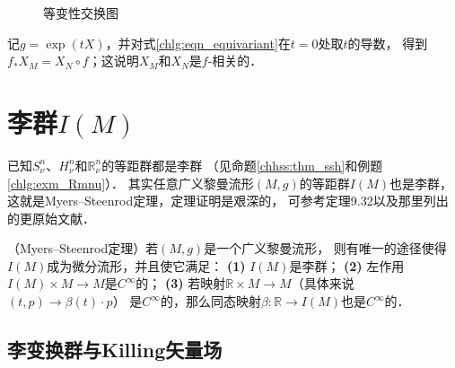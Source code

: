 \begin{figure}[htb]
    \centering
    \caption{等变性交换图}\label{chlg:pic_eqv-exchange}
\end{figure}

记$g=\exp(t X)$，并对式\eqref{chlg:eqn_equivariant}在$t=0$处取$t$的导数，
得到$f_* X_M = X_N \circ f$；这说明$X_M$和$X_N$是$f$-相关的．




\section{李群$I(M)$}\label{chlg:sec_IM}

已知$S^n_\nu$、$H^n_\nu$和$\mathbb{R}^n_\nu$的等距群都是{\kaishu 李群}
（见命题\ref{chhss:thm_ssh}和例题\ref{chlg:exm_Rmnu}）．
其实任意广义黎曼流形$(M,g)$的等距群$I(M)$也是{\kaishu 李群}，
这就是Myers--Steenrod定理，定理证明是艰深的，
可参考\parencite{oneill1983}定理9.32以及那里列出的更原始文献．


\begin{theorem}\label{chlg:thm_ISOM}
    （Myers--Steenrod定理）若$(M,g)$是一个广义黎曼流形，
    则有唯一的途径使得$I(M)$成为微分流形，并且使它满足：
    {\bfseries (1)} $I(M)$是李群；
    {\bfseries (2)} 左作用$I(M)\times M\to M$是$C^\infty$的；
    {\bfseries (3)} 若映射$\mathbb{R}\times M\to M$（具体来说$(t,p)\to \beta(t)\cdot p$）
    是$C^\infty$的，那么同态映射$\beta : \mathbb{R}\to I(M)$也是$C^\infty$的．
\end{theorem}


\subsection{李变换群与Killing矢量场}\label{chlg:sec_killing}

